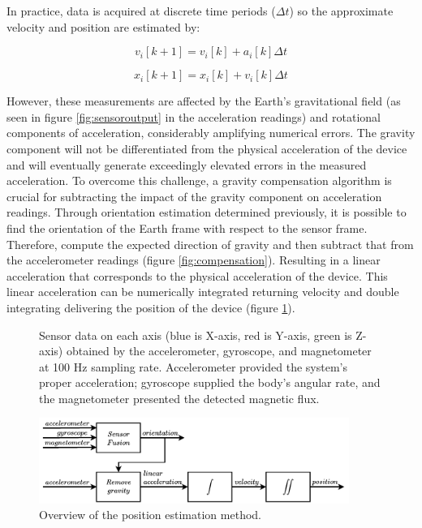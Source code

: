 In practice, data is acquired at discrete time periods ($\Delta t$) so the approximate velocity and position are estimated by:

\begin{equation}
    v_i[k+1]= v_i[k]+a_i[k]\Delta t
\end{equation}

\begin{equation}
    x_i[k+1]= x_i[k]+v_i[k]\Delta t
\end{equation}

However, these measurements are affected by the Earth's gravitational field (as seen in figure \ref{fig:sensoroutput} in the acceleration readings) and rotational components of acceleration, considerably amplifying numerical errors. The gravity component will not be differentiated from the physical acceleration of the device and will eventually generate exceedingly elevated errors in the measured acceleration. To overcome this challenge, a gravity compensation algorithm is crucial for subtracting the impact of the gravity component on acceleration readings. Through orientation estimation determined previously, it is possible to find the orientation of the Earth frame with respect to the sensor frame. Therefore, compute the expected direction of gravity and then subtract that from the accelerometer readings (figure \ref{fig:compensation}). Resulting in a linear acceleration that corresponds to the physical acceleration of the device. This linear acceleration can be numerically integrated returning velocity and double integrating delivering the position of the device (figure \ref{fig:position}).


\begin{figure}
    \centering
    \resizebox{1\linewidth}{!}{}
    \caption{Sensor data on each axis (blue is X-axis, red is Y-axis, green is Z-axis) obtained by the accelerometer, gyroscope, and magnetometer at 100 Hz sampling rate. Accelerometer provided the system’s proper acceleration; gyroscope supplied the body’s angular rate, and the magnetometer presented the detected magnetic flux.}
\end{figure}

\begin{figure}[!h]
    \centering
    \includegraphics[width=0.9\textwidth]{figures/orientation_position.pdf}
    \caption{Overview of the position estimation method.}
    \label{fig:position}
\end{figure}

